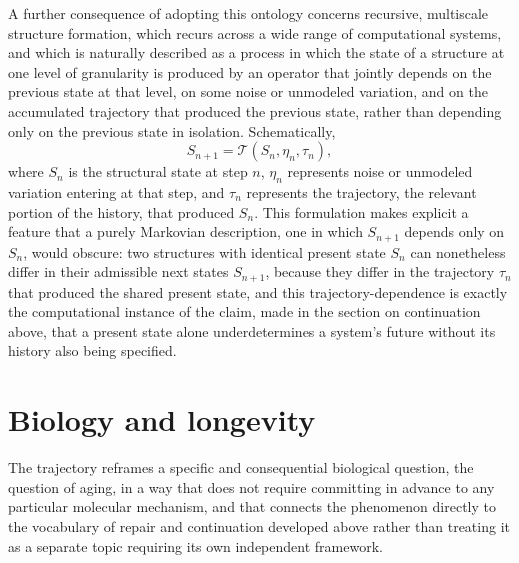 \documentclass[11pt]{article}
\begin{document}
A further consequence of adopting this ontology concerns recursive, multiscale structure formation, which recurs across a wide range of computational systems, and which is naturally described as a process in which the state of a structure at one level of granularity is produced by an operator that jointly depends on the previous state at that level, on some noise or unmodeled variation, and on the accumulated trajectory that produced the previous state, rather than depending only on the previous state in isolation. Schematically,
$$S_{n+1} = \mathcal{T}(S_n, \eta_n, \tau_n),$$
where $S_n$ is the structural state at step $n$, $\eta_n$ represents noise or unmodeled variation entering at that step, and $\tau_n$ represents the trajectory, the relevant portion of the history, that produced $S_n$. This formulation makes explicit a feature that a purely Markovian description, one in which $S_{n+1}$ depends only on $S_n$, would obscure: two structures with identical present state $S_n$ can nonetheless differ in their admissible next states $S_{n+1}$, because they differ in the trajectory $\tau_n$ that produced the shared present state, and this trajectory-dependence is exactly the computational instance of the claim, made in the section on continuation above, that a present state alone underdetermines a system's future without its history also being specified.

\section{Biology and longevity}

The trajectory reframes a specific and consequential biological question, the question of aging, in a way that does not require committing in advance to any particular molecular mechanism, and that connects the phenomenon directly to the vocabulary of repair and continuation developed above rather than treating it as a separate topic requiring its own independent framework.
\end{document}
